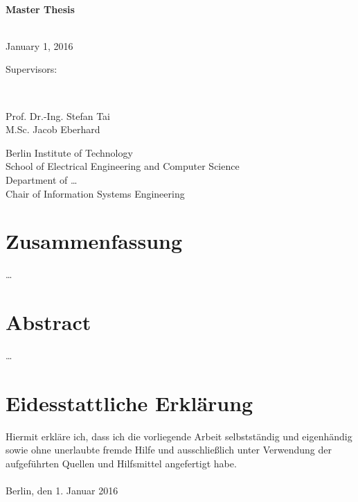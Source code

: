 \thispagestyle{empty}%
    \begin{titlepage}%
    \vfill%
    \begin{center}%
     \begin{spacing}{2.5}
         {\textbf{{\Huge \myTitle}{\\{\vspace*{3ex}\Large Master Thesis}}}}%
         \\[6ex]%
     \end{spacing}%
         {\Large \myAuthor}\\%
        \vfill%
        \vfill%
            {\LARGE January 1, 2016}\\%
        \vfill%
        \begin{minipage}[t]{0.25\textwidth}%
            \flushright\Large%
            Supervisors:~%
        \end{minipage}%
        \vspace{0pt}~%
        \begin{minipage}[t]{0.5\textwidth}%
        	\flushleft\Large%
        	Prof. Dr.-Ing. Stefan Tai\\%
        	M.Sc. Jacob Eberhard
        \end{minipage}%
                \vfill%
                    {%
                        Berlin Institute of Technology\\%
                        School of Electrical Engineering and Computer Science\\%
                        Department of \dots\\%
                        Chair of Information Systems Engineering%
                    }%
        \end{center}%
%
        \end{titlepage}%

\cleardoublepage
\section*{Zusammenfassung}
\dots

\section*{Abstract}
\dots

\vfill

\section*{Eidesstattliche Erklärung}
Hiermit erkläre ich, dass ich die vorliegende Arbeit selbstständig und eigenhändig sowie ohne unerlaubte fremde Hilfe und ausschließlich unter Verwendung der aufgeführten Quellen und Hilfsmittel angefertigt habe.\\[1.25cm]

\noindent\makebox[5cm]{\dotfill}\\
\noindent\makebox[5cm]{\myAuthor \hfill} Berlin, den 1. Januar 2016

\cleardoublepage